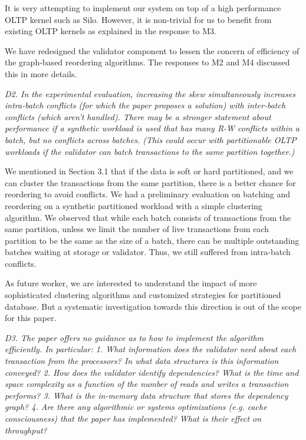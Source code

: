 \documentclass{article}
\begin{document}
\bigskip

It is very attempting to implement our system on top of a high performance OLTP kernel such as Silo. However, it is non-trivial for us to benefit from existing OLTP kernels as explained in the response to M3. 

We have redesigned the validator component to lessen the concern of efficiency of the graph-based reordering algorithms. The responses to M2 and M4 discussed this in more details.

\bigskip

\emph{D2. In the experimental evaluation, increasing the skew simultaneously increases intra-batch conflicts (for which the paper proposes a solution) with inter-batch conflicts (which aren't handled). There may be a stronger statement about performance if a synthetic workload is used that has many R-W conflicts within a batch, but no conflicts across batches. (This could occur with partitionable OLTP workloads if the validator can batch transactions to the same partition together.)}

\bigskip
We mentioned in Section 3.1 that if the data is soft or hard partitioned, and we can cluster the transactions from the same partition, there is a better chance for reordering to avoid conflicts. We had a preliminary evaluation on batching and reordering on a synthetic partitioned workload with a simple clustering algorithm. We observed that while each batch consists of transactions from the same partition, unless we limit the number of live transactions from each partition to be the same as the size of a batch, there can be multiple outstanding batches waiting at storage or validator. Thus, we still suffered from intra-batch conflicts. 

As future worker, we are interested to understand the impact of more sophisticated clustering algorithms and customized strategies for partitioned database. But a systematic investigation towards this direction is out of the scope for this paper.

\bigskip

\emph{D3. The paper offers no guidance as to how to implement the algorithm efficiently. In particular:
	1. What information does the validator need about each transaction from the processors? In what data structures is this information conveyed?
	2. How does the validator identify dependencies? What is the time and space complexity as a function of the number of reads and writes a transaction performs?
	3. What is the in-memory data structure that stores the dependency graph? 
	4. Are there any algorithmic or systems optimizations (e.g. cache consciousness) that the paper has implemented? What is their effect on throughput?}
\end{document}
